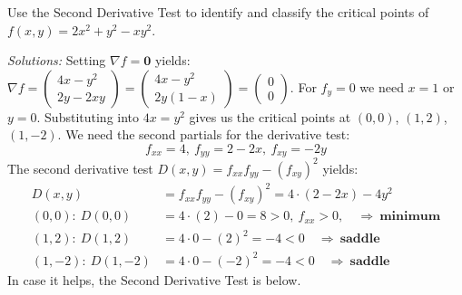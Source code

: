 
\ifnum {}

    \question[4]{} Use the Second Derivative Test to identify and classify the critical points of $f(x,y) = 2x^2+y^2-xy^2$. 

    \ifnum {} {\color{DarkBlue} \textit{Solutions:} Setting $\nabla f = \mathbf 0$ yields: $
    \nabla f =
    \begin{pmatrix} 4x-y^2 \\ 2y-2xy \end{pmatrix} = \begin{pmatrix} 4x-y^2 \\ 2y(1-x) \end{pmatrix} = \begin{pmatrix} 0\\0\end{pmatrix}
    $. For $f_y=0$ we need $x=1$ or $y=0$. Substituting into $4x=y^2$ gives us the critical points at $(0,0)$, $(1,2)$, $(1,-2)$. We need the second partials for the derivative test: 
    $$f_{xx} = 4, \ f_{yy} = 2-2x, \ f_{xy} = -2y$$
    The second derivative test $D(x,y) = f_{xx}f_{yy}-(f_{xy})^2$ yields:
    \begin{align*}
        D(x,y) &= f_{xx}f_{yy}-(f_{xy})^2 = 4\cdot(2-2x) - 4y^2\\
        (0,0): \ D(0,0) &= 4\cdot (2) - 0 = 8 > 0, \ f_{xx}>0, \quad \Rightarrow \ \textbf{minimum} \\
        (1,2): \ D(1,2) &= 4\cdot 0 - (2)^2 =-4 < 0  \quad \Rightarrow \ \textbf{saddle} \\
        (1,-2): \ D(1,-2) &= 4\cdot 0 - (-2)^2 = -4 < 0  \quad \Rightarrow \ \textbf{saddle} 
    \end{align*}
    In case it helps, the Second Derivative Test is below. 
        \begin{center}
\end{center}}
